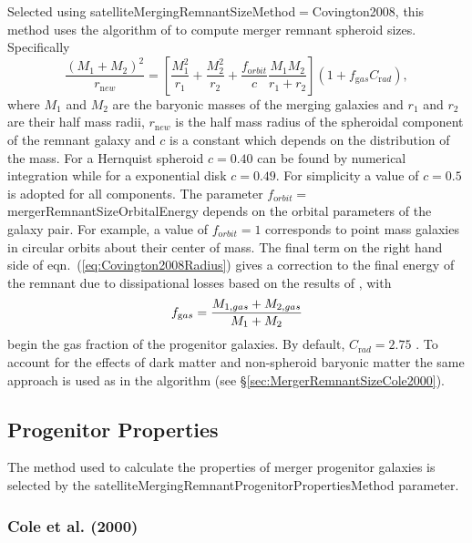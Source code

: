 Selected using {\normalfont \ttfamily satelliteMergingRemnantSizeMethod}$=${\normalfont \ttfamily Covington2008}, this method uses the algorithm of \cite{covington_predicting_2008} to compute merger remnant spheroid sizes. Specifically
\begin{equation}
\frac{(M_1+M_2)^2}{ r_{\mathrm new}} =
\left[ \frac{M_1^2}{r_1} + \frac{M_2^2}{r_2} + \frac{ f_{\mathrm orbit}}{c}
\frac{M_1 M_2}{r_1+r_2}\right] \left( 1 + f_{\mathrm gas} C_{\mathrm rad} \right),
\label{eq:Covington2008Radius}
\end{equation}
where $M_1$ and $M_2$ are the baryonic masses of the merging galaxies and $r_1$
and $r_2$ are their half mass radii, $r_{\mathrm new}$ is the half mass radius of the spheroidal \gls{component} of the remnant galaxy and $c$ is a constant which depends on the distribution of the mass. For a Hernquist spheroid $c=0.40$ can be found by numerical integration while for a exponential disk $c=0.49$. For simplicity a value of $c=0.5$ is adopted for all components. The parameter $f_{\mathrm orbit}=${\normalfont \ttfamily mergerRemnantSizeOrbitalEnergy} depends on the orbital parameters of the galaxy pair. For example, a value of $f_{\mathrm orbit} = 1$ corresponds to point mass galaxies in circular orbits about their center of mass. The final term on the right hand side of eqn.~(\ref{eq:Covington2008Radius}) gives a correction to the final energy of the remnant due to dissipational losses based on the results of \cite{covington_effects_2011}, with
\begin{equation}
 f_{\mathrm gas} = {M_{\mathrm 1,gas}+M_{\mathrm 2,gas} \over M_1+M_2}
\end{equation}
begin the gas fraction of the progenitor galaxies. By default, $C_{\mathrm rad}=2.75$ \citep{covington_effects_2011}. To account for the effects of dark matter and non-spheroid baryonic matter the same approach is used as in the \cite{cole_hierarchical_2000} algorithm (see \S\ref{sec:MergerRemnantSizeCole2000}). 

\subsection{Progenitor Properties}

The method used to calculate the properties of merger progenitor galaxies is selected by the {\normalfont \ttfamily satelliteMergingRemnantProgenitorPropertiesMethod} parameter.

\subsubsection{Cole et al. (2000)}

